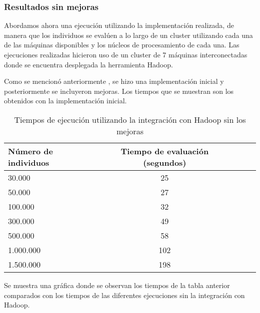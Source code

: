 \subsubsection{Resultados sin mejoras}

Abordamos ahora una ejecución utilizando la implementación realizada, de manera que los individuos se evalúen a lo largo de un cluster utilizando cada una de las m\'aquinas disponibles y los núcleos de procesamiento de cada una. Las ejecuciones realizadas hicieron uso de un cluster de 7 m\'aquinas interconectadas donde se encuentra desplegada la herramienta Hadoop. 

Como se mencion\'o anteriormente , se hizo una implementación inicial y posteriormente se incluyeron mejoras. Los tiempos que se muestran  son los obtenidos con la implementación inicial.
\label{resultados-mejoras}

\begin{table}[H]
  \begin{center}
    \begin{center}
    \begin{tabular}{l | c c c c}
    N\'umero de individuos & Tiempo de evaluaci\'on (segundos)\\ \hline
    30.000 & 25\\
    50.000 & 27\\
    100.000 & 32\\
    300.000 & 49\\
    500.000 & 58\\
    1.000.000 & 102\\
    1.500.000 & 198\\
    \end{tabular}
    \end{center}
    \caption{Tiempos de ejecución utilizando la integración con Hadoop sin los mejoras}
    \label{tabla_tiempos_hadoop_sin_mejoras}
  \end{center}
\end{table}

Se muestra una gráfica  donde se observan los tiempos de la tabla anterior comparados con los tiempos de las diferentes ejecuciones sin la integración con Hadoop.


